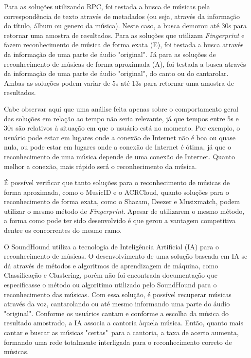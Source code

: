 Para as soluções utilizando RPC, foi testada a busca de músicas pela correspondência de texto através de metadados (ou seja, através da informação do título, álbum ou genero da música). Neste caso, a busca demorou até 30s para retornar uma amostra de resultados. Para as soluções que utilizam \textit{Fingerprint} e fazem reconhecimento de música de forma exata (E), foi testada a busca através da informação de uma parte de áudio "original". Já para as soluções de reconhecimento de músicas de forma aproximada (A), foi testada a busca através da informação de uma parte de áudio "original", do canto ou do cantarolar. Ambas as soluções podem variar de 5s até 13s para retornar uma amostra de resultados.

Cabe observar aqui que uma análise feita apenas sobre o comportamento geral das soluções em relação ao tempo não seria relevante, já que tempos entre 5s e 30s são relativos à situação em que o usuário está no momento. Por exemplo, o usuário pode estar em lugares onde a conexão de Internet não é boa ou quase nula, ou pode estar em lugares onde a conexão de Internet é ótima, já que o reconhecimento de uma música depende de uma conexão de Internet. Quanto melhor a conexão, mais rápido será o reconhecimento da música.

É possível verificar que tanto soluções para o reconhecimento de músicas de forma aproximada, como o MusicID e o ACRCloud, quanto soluções para o reconhecimento de forma exata, como o Shazam, Deezer e Musixmatch, podem utilizar o mesmo método de \textit{Fingerprint}. Apesar de utilizarem o mesmo método, a forma como pode ter sido desenvolvido é que gerou a vantagem competitiva dentre os concorrentes do mesmo ramo.

O SoundHound utiliza a tecnologia de Inteligência Artificial (IA)  para o reconhecimento de músicas. O desenvolvimento de uma solução baseada em IA se dá através de métodos e algoritmos de aprendizagem de máquina, como Classificação e Clustering, porém não foi encontrada documentação que especificasse o método ou algoritimo utilizado pelo SoundHound para o reconhecimento das músicas. Com essa solução, é possível recuperar músicas através da voz, cantarolando ou até mesmo informando uma parte do áudio "original". Conforme os usuários cantam e conforme a escolha da música do resultado amostrado, a IA associa a cantoria àquela música. Então, quanto mais cantar e buscar as músicas "certas"\ para a cantoria, a taxa de acerto aumenta, formando uma rede totalmente interligada para o reconhecimento correto de músicas.

